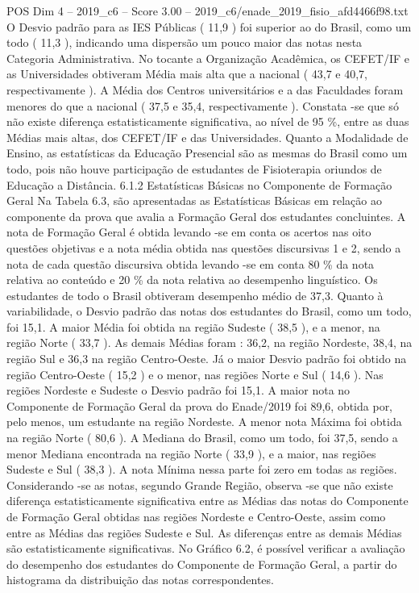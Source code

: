 \begin{textsample}{POS Dim 4 – 2019\_c6 – Score 3.00 – 2019\_c6/enade\_2019\_fisio\_afd4466f98.txt}
O Desvio padrão para as IES Públicas ( 11,9 ) foi superior ao do Brasil, como um todo ( 11,3 ), indicando uma dispersão um pouco maior das notas nesta Categoria Administrativa.
No tocante a Organização Acadêmica, os CEFET/IF e as Universidades obtiveram Média mais alta que a nacional ( 43,7 e 40,7, respectivamente ).
A Média dos Centros universitários e a das Faculdades foram menores do que a nacional ( 37,5 e 35,4, respectivamente ).
Constata -se que só não existe diferença estatisticamente significativa, ao nível de 95 \%, entre as duas Médias mais altas, dos CEFET/IF e das Universidades.
Quanto a Modalidade de Ensino, as estatísticas da Educação Presencial são as mesmas do Brasil como um todo, pois não houve participação de estudantes de Fisioterapia oriundos de Educação a Distância. 6.1.2 Estatísticas Básicas no Componente de Formação Geral Na Tabela 6.3, são apresentadas as Estatísticas Básicas em relação ao componente da prova que avalia a Formação Geral dos estudantes concluintes.
A nota de Formação Geral é obtida levando -se em conta os acertos nas oito questões objetivas e a nota média obtida nas questões discursivas 1 e 2, sendo a nota de cada questão discursiva obtida levando -se em conta 80 \% da nota relativa ao conteúdo e 20 \% da nota relativa ao desempenho linguístico.
Os estudantes de todo o Brasil obtiveram desempenho médio de 37,3.
Quanto à variabilidade, o Desvio padrão das notas dos estudantes do Brasil, como um todo, foi 15,1.
A maior Média foi obtida na região Sudeste ( 38,5 ), e a menor, na região Norte ( 33,7 ).
As demais Médias foram : 36,2, na região Nordeste, 38,4, na região Sul e 36,3 na região Centro-Oeste.
Já o maior Desvio padrão foi obtido na região Centro-Oeste ( 15,2 ) e o menor, nas regiões Norte e Sul ( 14,6 ).
Nas regiões Nordeste e Sudeste o Desvio padrão foi 15,1.
A maior nota no Componente de Formação Geral da prova do Enade/2019 foi 89,6, obtida por, pelo menos, um estudante na região Nordeste.
A menor nota Máxima foi obtida na região Norte ( 80,6 ).
A Mediana do Brasil, como um todo, foi 37,5, sendo a menor Mediana encontrada na região Norte ( 33,9 ), e a maior, nas regiões Sudeste e Sul ( 38,3 ).
A nota Mínima nessa parte foi zero em todas as regiões.
Considerando -se as notas, segundo Grande Região, observa -se que não existe diferença estatisticamente significativa entre as Médias das notas do Componente de Formação Geral obtidas nas regiões Nordeste e Centro-Oeste, assim como entre as Médias das regiões Sudeste e Sul.
As diferenças entre as demais Médias são estatisticamente significativas.
No Gráfico 6.2, é possível verificar a avaliação do desempenho dos estudantes do Componente de Formação Geral, a partir do histograma da distribuição das notas correspondentes.

\end{textsample}
